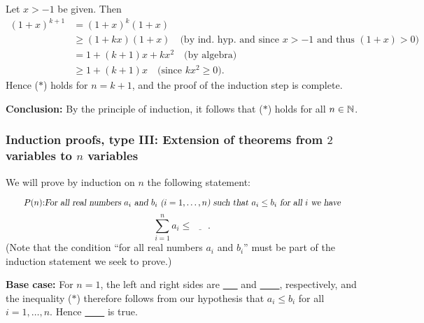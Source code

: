 Let $x>-1$ be given. Then
\begin{align*}
(1+x)^{k+1}
&=(1+x)^k(1+x)
\\
&\ge (1+kx)(1+x) 
\quad\text{(by ind. hyp. and since $x>-1$ and thus $(1+x)>0$)}
\\
&=1+(k+1)x +kx^2
\quad\text{(by algebra)}
\\
&\ge 1+(k+1)x 
\quad\text{(since $kx^2\ge0$)}.
\end{align*}
Hence ($*$) holds for $n=k+1$, and the proof of the induction step is
complete.

\textbf{Conclusion:} By the principle of induction, it follows that ($*$)
holds for all $n\in\mathbb{N}$.

\subsubsection{Induction proofs, type III:
Extension of theorems from $2$ variables to $n$ variables}

We will prove by induction on $n$ the following statement: 

\[
\tag*{$P(n)$:}
\parbox{5in}{\slshape For all real numbers $a_i$ and $b_i$ ($i=1,\dots,n$)
such that $a_i\le b_i$ for all $i$ we
have}
\]
\[
\sum_{i=1}^na_i\le \underline{~~~~~~~}. 
\tag{$*$}
\]
(Note that the condition ``for all real numbers $a_i$ and $b_i$''
must be part of the induction statement we seek to prove.)

\textbf{Base case:} For $n=1$, the 
left and right sides are \underline{~~~} and \underline{~~~~}, respectively, and the
inequality ($*$) therefore follows from our hypothesis that
$a_i\le b_i$ for all $i=1,\dots,n$.  Hence \underline{~~~~} is true.

